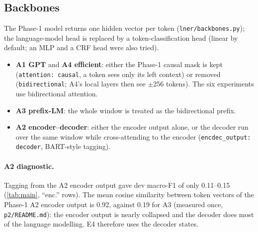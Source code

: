 \documentclass[11pt,a4paper]{article}
\newcommand{\code}[1]{\texttt{\small #1}}
\begin{document}
\subsection{Backbones}
The Phase-1 model returns one hidden vector per token (\code{lner/backbones.py}); the language-model head
is replaced by a token-classification head (linear by default; an MLP and a CRF head \cite{lafferty2001crf} were also tried).
\begin{itemize}
  \item \textbf{A1 GPT} and \textbf{A4 efficient}: either the Phase-1 causal mask is kept
  (\code{attention: causal}, a token sees only its left context) or removed (\code{bidirectional}; A4's local
  layers then see $\pm$256 tokens).  The six experiments use bidirectional attention.
  \item \textbf{A3 prefix-LM}: the whole window is treated as the bidirectional prefix.
  \item \textbf{A2 encoder--decoder}: either the encoder output alone, or the decoder run over the same window
  while cross-attending to the encoder (\code{encdec\_output: decoder}, BART-style tagging).
\end{itemize}

\paragraph{A2 diagnostic.} Tagging from the A2 encoder output gave dev macro-F1 of only 0.11--0.15
(\autoref{tab:main}, ``enc.'' rows).  The mean cosine similarity between token vectors of the Phase-1 A2
encoder output is 0.92, against 0.19 for A3 (measured once, \code{p2/README.md}): the encoder output is
nearly collapsed and the decoder does most of the language modelling.  E4 therefore uses the decoder states.
\end{document}
